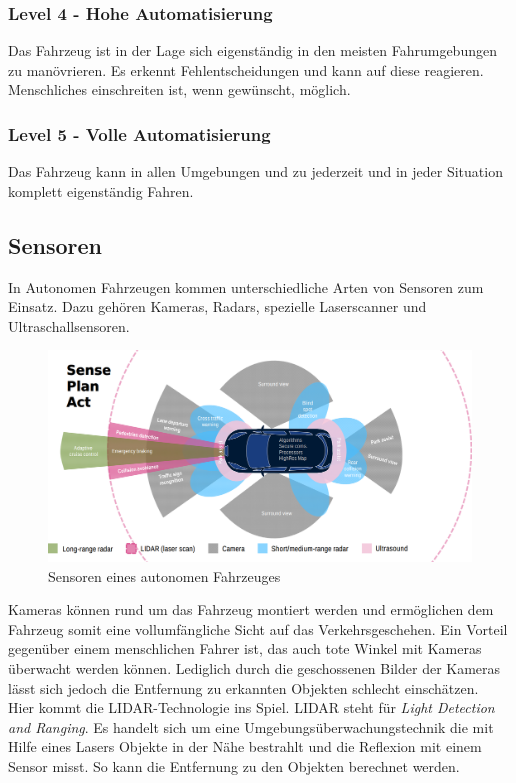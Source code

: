 \subsubsection*{Level 4 - Hohe Automatisierung} Das Fahrzeug ist in der Lage sich eigenständig in den meisten Fahrumgebungen zu manövrieren. Es erkennt Fehlentscheidungen und kann auf diese reagieren. Menschliches einschreiten ist, wenn gewünscht, möglich.

\subsubsection*{Level 5 - Volle Automatisierung} Das Fahrzeug kann in allen Umgebungen und zu jederzeit und in jeder Situation komplett eigenständig Fahren.

\subsection{Sensoren}

In Autonomen Fahrzeugen kommen unterschiedliche Arten von Sensoren zum Einsatz. 
Dazu gehören Kameras, Radars, spezielle Laserscanner und Ultraschallsensoren.\\

\begin{figure}[H]
    \centering
    \includegraphics[width=.485\textwidth]{resources/images/sensors.png}
    \caption{Sensoren eines autonomen Fahrzeuges \cite{smith2015automated}}
\end{figure}

Kameras können rund um das Fahrzeug montiert werden und ermöglichen dem Fahrzeug somit eine vollumfängliche Sicht auf das Verkehrsgeschehen. Ein Vorteil gegenüber einem menschlichen Fahrer ist, das auch tote Winkel mit Kameras überwacht werden können. Lediglich durch die geschossenen Bilder der Kameras lässt sich jedoch die Entfernung zu erkannten Objekten schlecht einschätzen.\\

Hier kommt die LIDAR-Technologie \cite{himmelsbach2008lidar} ins Spiel. LIDAR steht für \textit{Light Detection and Ranging}. Es handelt sich um eine Umgebungsüberwachungstechnik die mit Hilfe eines Lasers Objekte in der Nähe bestrahlt und die Reflexion mit einem Sensor misst. So kann die Entfernung zu den Objekten berechnet werden.\\

